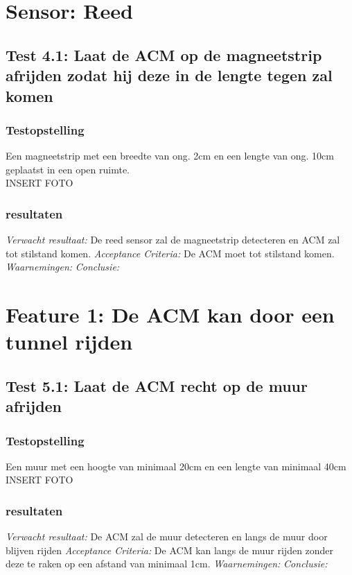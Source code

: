 \documentclass{article}
\begin{document}
\section{Sensor: Reed}
\subsection{Test 4.1: Laat de ACM op de magneetstrip afrijden zodat hij deze in de lengte tegen zal komen}
\subsubsection{Testopstelling}
Een magneetstrip met een breedte van ong. 2cm en een lengte van ong. 10cm geplaatst in een open ruimte.\\
INSERT FOTO
\subsubsection{resultaten}
\textit{Verwacht resultaat: }De reed sensor zal de magneetstrip detecteren en ACM zal tot stilstand komen.
\newline
\textit{Acceptance Criteria: }De ACM moet tot stilstand komen.
\newline
\textit{Waarnemingen: }
\newline
\textit{Conclusie: }

\newpage




\section{Feature 1: De ACM kan door een tunnel rijden}

\subsection{Test 5.1: Laat de ACM recht op de muur afrijden}
\subsubsection{Testopstelling}
Een muur met een hoogte van minimaal 20cm en een lengte van minimaal 40cm\\
INSERT FOTO
\subsubsection{resultaten}
\textit{Verwacht resultaat: }De ACM zal de muur detecteren en langs de muur door blijven rijden
\newline
\textit{Acceptance Criteria: }De ACM kan langs de muur rijden zonder deze te raken op een afstand van minimaal 1cm. 
\newline
\textit{Waarnemingen: }
\newline
\textit{Conclusie: }
\end{document}
